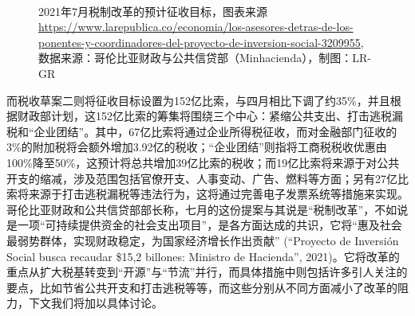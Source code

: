\documentclass{phyasgn}\usepackage{nag}
\begin{document}
\begin{figure}[!h]
	\centering
	\vspace{-0.3\baselineskip}
	\quad
	\\
	\caption{2021年7月税制改革的预计征收目标，图表来源\footnotesize{\url{https://www.larepublica.co/economia/los-asesores-detras-de-los-ponentes-y-coordinadores-del-proyecto-de-inversion-social-3209955}}, 数据来源：哥伦比亚财政与公共信贷部（Minhacienda），制图：LR-GR
}
	\end{figure}
\par 而税收草案二则将征收目标设置为152亿比索，与四月相比下调了约35\%，并且根据财政部计划，这152亿比索的筹集将围绕三个中心：紧缩公共支出、打击逃税漏税和“企业团结”。其中，67亿比索将通过企业所得税征收，而对金融部门征收的3\%的附加税将会额外增加3.92亿的税收；“企业团结”则指将工商税税收优惠由100\%降至50\%，这预计将总共增加39亿比索的税收；而19亿比索将来源于对公共开支的缩减，涉及范围包括官僚开支、人事变动、广告、燃料等方面；另有27亿比索将来源于打击逃税漏税等违法行为，这将通过完善电子发票系统等措施来实现。哥伦比亚财政和公共信贷部部长称，七月的这份提案与其说是“税制改革”，不如说是一项“可持续提供资金的社会支出项目”，是各方面达成的共识，它将“惠及社会最弱势群体，实现财政稳定，为国家经济增长作出贡献” (“Proyecto de Inversión Social busca recaudar \$15,2 billones: Ministro de Hacienda”, 2021)。它将改革的重点从扩大税基转变到“开源”与“节流”并行，而具体措施中则包括许多引人关注的要点，比如节省公共开支和打击逃税等等，而这些分别从不同方面减小了改革的阻力，下文我们将加以具体讨论。
\end{document}
